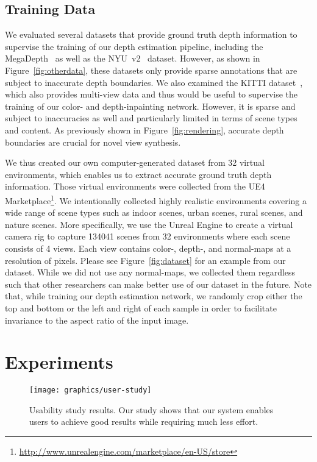 \documentclass[acmtog,authorversion]{acmart}
\begin{document}
\subsection{Training Data}
\label{sec:dataset}

We evaluated several datasets that provide ground truth depth information to supervise the training of our depth estimation pipeline, including the MegaDepth~\cite{Li_CVPR_2018} as well as the NYU~v2~\cite{Silberman_ECCV_2012} dataset. However, as shown in Figure~\ref{fig:otherdata}, these datasets only provide sparse annotations that are subject to inaccurate depth boundaries. We also examined the KITTI dataset~\cite{Geiger_OTHER_2013}, which also provides multi-view data and thus would be useful to supervise the training of our color- and depth-inpainting network. However, it is sparse and subject to inaccuracies as well and particularly limited in terms of scene types and content. As previously shown in Figure~\ref{fig:rendering}, accurate depth boundaries are crucial for novel view synthesis.

We thus created our own computer-generated dataset from 32 virtual environments, which enables us to extract accurate ground truth depth information. Those virtual environments were collected from the UE4 Marketplace\footnote{\url{http://www.unrealengine.com/marketplace/en-US/store}}. We intentionally collected highly realistic environments covering a wide range of scene types such as indoor scenes, urban scenes, rural scenes, and nature scenes. More specifically, we use the Unreal Engine to create a virtual camera rig to capture 134041 scenes from 32 environments where each scene consists of 4 views. Each view contains color-, depth-, and normal-maps at a resolution of  pixels. Please see Figure~\ref{fig:dataset} for an example from our dataset. While we did not use any normal-maps, we collected them regardless such that other researchers can make better use of our dataset in the future. Note that, while training our depth estimation network, we randomly crop either the top and bottom or the left and right of each sample in order to facilitate invariance to the aspect ratio of the input image. 
\section{Experiments}
\label{sec:experiements}
\begin{figure}\centering
    \hspace{-0.2cm}\texttt{[image: graphics/user-study]}\vspace{-0.2cm}
	\caption{Usability study results. Our study shows that our system enables users to achieve good results while requiring much less effort.}\vspace{-0.2cm}
	\label{fig:user-study}
\end{figure}
\end{document}
